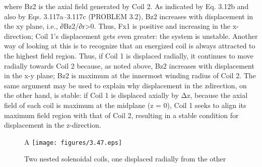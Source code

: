 where Bz2 is the axial field generated by Coil 2. As indicated by Eq. 3.12b and also
by Eqs. 3.117a–3.117c (PROBLEM 3.2), Bz2 increases with displacement in the xy plane, i.e., ∂Bz2/∂r>0. Thus, Fx1 is positive and increasing in the x-direction;
Coil 1’s displacement gets even greater: the system is unstable.
Another way of looking at this is to recognize that an energized coil is always
attracted to the highest field region. Thus, if Coil 1 is displaced radially, it continues to move radially towards Coil 2 because, as noted above, Bz2 increases with
displacement in the x-y plane; Bz2 is maximum at the innermost winding radius
of Coil 2. The same argument may be used to explain why displacement in the zdirection, on the other hand, is stable: if Coil 1 is displaced axially by Δz, because
the axial field of each coil is maximum at the midplane (z = 0), Coil 1 seeks to
align its maximum field region with that of Coil 2, resulting in a stable condition
for displacement in the z-direction.

\begin{figure}[htbp]A
	\centering
	\texttt{[image: figures/3.47.eps]}
	\caption{Two nested solenoidal coils, one displaced radially from the other}
\end{figure}
\newpage




